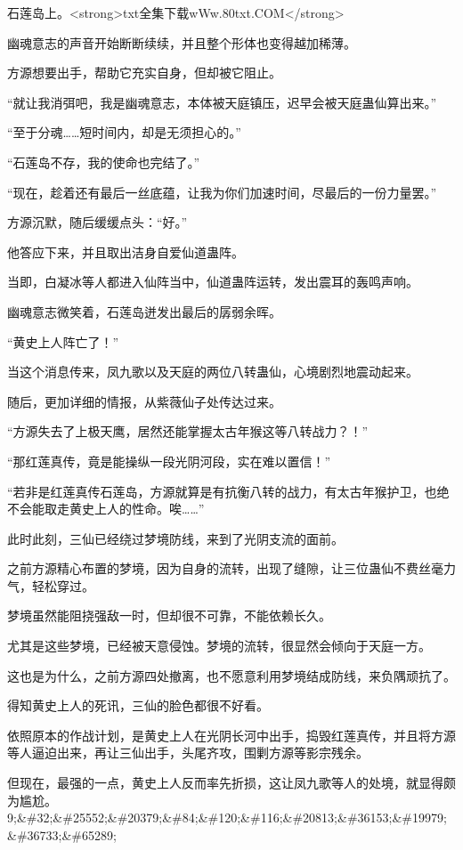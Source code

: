 
\begin{this_body}

石莲岛上。<strong>txt全集下载wWw.80txt.COM</strong>

幽魂意志的声音开始断断续续，并且整个形体也变得越加稀薄。

方源想要出手，帮助它充实自身，但却被它阻止。

“就让我消弭吧，我是幽魂意志，本体被天庭镇压，迟早会被天庭蛊仙算出来。”

“至于分魂……短时间内，却是无须担心的。”

“石莲岛不存，我的使命也完结了。”

“现在，趁着还有最后一丝底蕴，让我为你们加速时间，尽最后的一份力量罢。”

方源沉默，随后缓缓点头：“好。”

他答应下来，并且取出洁身自爱仙道蛊阵。

当即，白凝冰等人都进入仙阵当中，仙道蛊阵运转，发出震耳的轰鸣声响。

幽魂意志微笑着，石莲岛迸发出最后的孱弱余晖。

“黄史上人阵亡了！”

当这个消息传来，凤九歌以及天庭的两位八转蛊仙，心境剧烈地震动起来。

随后，更加详细的情报，从紫薇仙子处传达过来。

“方源失去了上极天鹰，居然还能掌握太古年猴这等八转战力？！”

“那红莲真传，竟是能操纵一段光阴河段，实在难以置信！”

“若非是红莲真传石莲岛，方源就算是有抗衡八转的战力，有太古年猴护卫，也绝不会能取走黄史上人的性命。唉……”

此时此刻，三仙已经绕过梦境防线，来到了光阴支流的面前。

之前方源精心布置的梦境，因为自身的流转，出现了缝隙，让三位蛊仙不费丝毫力气，轻松穿过。

梦境虽然能阻挠强敌一时，但却很不可靠，不能依赖长久。

尤其是这些梦境，已经被天意侵蚀。梦境的流转，很显然会倾向于天庭一方。

这也是为什么，之前方源四处撤离，也不愿意利用梦境结成防线，来负隅顽抗了。

得知黄史上人的死讯，三仙的脸色都很不好看。

依照原本的作战计划，是黄史上人在光阴长河中出手，捣毁红莲真传，并且将方源等人逼迫出来，再让三仙出手，头尾齐攻，围剿方源等影宗残余。

但现在，最强的一点，黄史上人反而率先折损，这让凤九歌等人的处境，就显得颇为尴尬。9;\&\#32;\&\#25552;\&\#20379;\&\#84;\&\#120;\&\#116;\&\#20813;\&\#36153;\&\#19979;\&\#36733;\&\#65289;


\end{this_body}
